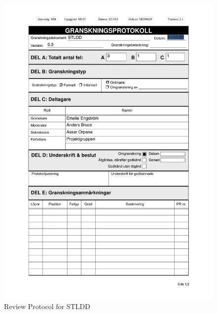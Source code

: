 \documentclass{article}
\begin{document}
 
 \begin{figure}
     \centering
     \includegraphics[width=13cm]{images/STLDD - Granskningsprotokoll-1}
     \renewcommand\figurename{Figure}
     \caption{Review Protocol for STLDD}
     \label{fig:my_label}
 \end{figure}
\end{document}
